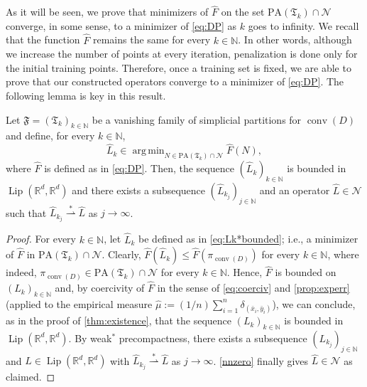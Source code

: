 \documentclass[onefignum,onetabnum]{siamonline250211}
\newcommand{\Lip}{\operatorname{Lip}}
\newcommand{\N}{\mathcal{N}}
\newcommand{\weakk}{\stackrel{\ast}{\rightharpoonup}}
\newcommand{\R}{\mathbb{R}}
\newcommand{\conv}{\operatorname{conv}}
\newcommand{\bx}{\bar{x}}
\newcommand{\by}{\bar{y}}
\DeclareMathOperator*{\argmin}{arg\,min}
\begin{document}
 As it will be seen, we prove that minimizers of $\widehat{F}$ on the set $\mathrm{PA}(\mathfrak{T}_k)\cap\mathcal{N}$ converge, in some sense, to a minimizer of \cref{eq:DP} as $k$ goes to infinity. We recall that the function $\widehat{F}$ remains the same for every $k\in\mathbb{N}$. In other words, although we increase the number of points at every iteration, penalization is done only for the initial training points. Therefore, once a training set is fixed, we are able to prove that our constructed operators converge to a minimizer of \cref{eq:DP}. The following lemma is key in this result.
\begin{lemma}\label{lem:311}
Let $\mathfrak{F}=(\mathfrak{T}_k)_{k\in\mathbb{N}}$ be a vanishing family of simplicial partitions for $\conv(D)$ and define, for every $k\in\mathbb{N}$,
\begin{equation}\label{eq:Lk*bounded}
\widehat{L}_k\in\argmin_{N\in \mathrm{PA}(\mathfrak{T}_k)\cap\mathcal{N}}\widehat{F}(N),
\end{equation}
where $\widehat{F}$ is defined as in \cref{eq:DP}. Then, the sequence $(\widehat{L}_k)_{k\in\mathbb{N}}$ is bounded in $\Lip(\R^d, \R^d)$ and there exists a subsequence $(\widehat{L}_{k_j})_{j\in\mathbb{N}}$ and an operator $\widehat{L}\in \mathcal{N}$ such that $\widehat{L}_{k_j}\weakk \widehat{L}$ as $j \to \infty$.
\end{lemma}
\begin{proof}
For every $k\in\mathbb{N}$, let $\widehat{L}_k$ be defined as in \cref{eq:Lk*bounded}; i.e., a minimizer of $\widehat{F}$ in $\mathrm{PA}(\mathfrak{T}_k)\cap\mathcal{N}$. Clearly, $\widehat{F}(\widehat{L}_{k})\leq \widehat{F}(\pi_{\conv (D)})$ for every $k\in\mathbb{N}$, where indeed, $\pi_{\conv(D)}\in \mathrm{PA}(\mathfrak{T}_k)\cap\N$ for every $k\in\mathbb{N}$. Hence, $\widehat{F}$ is bounded on $(L_k)_{k\in\mathbb{N}}$ and, by coercivity of $\widehat{F}$ in the sense of \cref{eq:coerciv} and \cref{prop:experr} (applied to the empirical measure $\hat{\mu}:=(1/n)\sum_{i=1}^n\delta_{(\bx_i, \by_i)}$), we can conclude, as in the proof of \cref{thm:existence}, that the sequence $(L_k)_{k\in\mathbb{N}}$ is bounded in $\Lip(\R^d, \R^d)$. By weak$^*$ precompactness, there exists a subsequence $(L_{k_j})_{j\in\mathbb{N}}$ and $\widehat{L}\in\Lip(\R^d,\R^d)$ with $\widehat{L}_{k_j}\weakk \widehat{L}$ as $j\to\infty$. \cref{nnzero} finally gives $\widehat{L}\in\N$ as claimed.
\end{proof}
\end{document}
